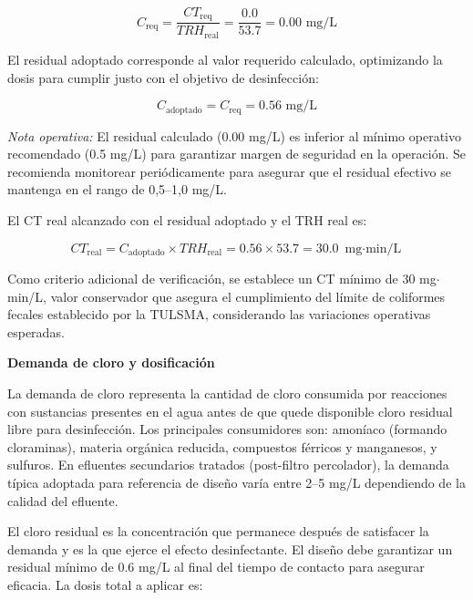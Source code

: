 \documentclass[12pt,a4paper]{article}
\begin{document}
\begin{equation}
C_{\text{req}} = \frac{CT_{\text{req}}}{TRH_{\text{real}}} = \frac{0.0}{53.7} = 0.00 \text{ mg/L}
\end{equation}

El residual adoptado corresponde al valor requerido calculado, optimizando la dosis para cumplir justo con el objetivo de desinfección:

\begin{equation}
C_{\text{adoptado}} = C_{\text{req}} = 0.56 \text{ mg/L}
\end{equation}

\textit{Nota operativa:} El residual calculado (0.00 mg/L) es inferior al mínimo operativo recomendado (0.5 mg/L) para garantizar margen de seguridad en la operación. Se recomienda monitorear periódicamente para asegurar que el residual efectivo se mantenga en el rango de 0,5--1,0 mg/L.

El CT real alcanzado con el residual adoptado y el TRH real es:

\begin{equation}
CT_{\text{real}} = C_{\text{adoptado}} \times TRH_{\text{real}} = 0.56 \times 53.7 = 30.0 \text{ mg$\cdot$min/L}
\end{equation}

Como criterio adicional de verificación, se establece un CT mínimo de 30 mg$\cdot$min/L, valor conservador que asegura el cumplimiento del límite de coliformes fecales establecido por la TULSMA, considerando las variaciones operativas esperadas.

\textbf{Demanda de cloro y dosificación}

La demanda de cloro representa la cantidad de cloro consumida por reacciones con sustancias presentes en el agua antes de que quede disponible cloro residual libre para desinfección. Los principales consumidores son: amoníaco (formando cloraminas), materia orgánica reducida, compuestos férricos y manganesos, y sulfuros. En efluentes secundarios tratados (post-filtro percolador), la demanda típica adoptada para referencia de diseño varía entre 2--5 mg/L dependiendo de la calidad del efluente.

El cloro residual es la concentración que permanece después de satisfacer la demanda y es la que ejerce el efecto desinfectante. El diseño debe garantizar un residual mínimo de 0.6 mg/L al final del tiempo de contacto para asegurar eficacia. La dosis total a aplicar es:
\end{document}
